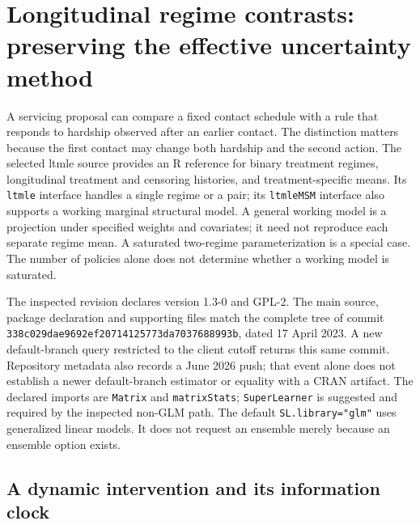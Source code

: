 \section{Longitudinal regime contrasts: preserving the effective uncertainty method}
\label{exec23:ltmle-regimes}

A servicing proposal can compare a fixed contact schedule with a rule that
responds to hardship observed after an earlier contact. The distinction matters
because the first contact may change both hardship and the second action.
The selected ltmle source provides an R reference for binary treatment regimes,
longitudinal treatment and censoring histories, and treatment-specific means.
Its \texttt{ltmle} interface handles a single regime or a pair; its
\texttt{ltmleMSM} interface also supports a working marginal structural model.
A general working model is a projection under specified weights and covariates;
it need not reproduce each separate regime mean. A saturated two-regime
parameterization is a special case. The number of policies alone does not
determine whether a working model is saturated.~\citep{exec23_ltmle_source}

The inspected revision declares version 1.3-0 and GPL-2. The main source,
package declaration and supporting files match the complete tree of commit
\texttt{338c029d}\allowbreak\texttt{ae9692ef}\allowbreak\texttt{20714125}\allowbreak\texttt{773da703}\allowbreak\texttt{7688993b}, dated 17 April 2023.
A new default-branch query restricted to the client cutoff returns this same
commit. Repository metadata also records a June 2026 push; that event alone
does not establish a newer default-branch estimator or equality with a CRAN
artifact. The declared imports are \texttt{Matrix} and \texttt{matrixStats};
\texttt{SuperLearner} is suggested and required by the inspected non-GLM path.
The default \texttt{SL.library="glm"} uses generalized linear models. It does
not request an ensemble merely because an ensemble option exists.
\citep{exec23_ltmle_source}

\subsection{A dynamic intervention and its information clock}

